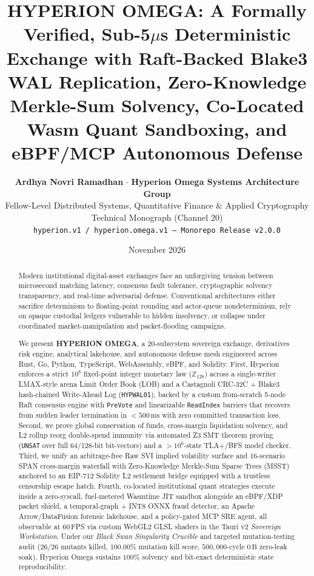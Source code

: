 \documentclass[10pt,twocolumn]{article}
\title{\Large \textbf{HYPERION OMEGA: A Formally Verified, Sub-5$\mu$s Deterministic Exchange with Raft-Backed Blake3 WAL Replication, Zero-Knowledge Merkle-Sum Solvency, Co-Located Wasm Quant Sandboxing, and eBPF/MCP Autonomous Defense}}
\author{
  \textbf{Ardhya Novri Ramadhan} \quad $\cdot$ \quad \textbf{Hyperion Omega Systems Architecture Group}\\
  \small Fellow-Level Distributed Systems, Quantitative Finance \& Applied Cryptography Technical Monograph (Channel 20)\\
  \small \texttt{hyperion.v1 / hyperion.omega.v1 --- Monorepo Release v2.0.0}
}
\date{November 2026}
\begin{document}
\maketitle

\begin{abstract}
Modern institutional digital-asset exchanges face an unforgiving tension between microsecond matching latency, consensus fault tolerance, cryptographic solvency transparency, and real-time adversarial defense. Conventional architectures either sacrifice determinism to floating-point rounding and actor-queue nondeterminism, rely on opaque custodial ledgers vulnerable to hidden insolvency, or collapse under coordinated market-manipulation and packet-flooding campaigns.

We present \textbf{HYPERION OMEGA}, a 20-subsystem sovereign exchange, derivatives risk engine, analytical lakehouse, and autonomous defense mesh engineered across Rust, Go, Python, TypeScript, WebAssembly, eBPF, and Solidity. First, Hyperion enforces a strict $10^8$ fixed-point integer monetary law ($\mathbb{Z}_{128}$) across a single-writer LMAX-style arena Limit Order Book (LOB) and a Castagnoli CRC-32C + Blake3 hash-chained Write-Ahead Log (\texttt{HYPWAL01}), backed by a custom from-scratch 5-node Raft consensus engine with \texttt{PreVote} and linearizable \texttt{ReadIndex} barriers that recovers from sudden leader termination in $<500\,\text{ms}$ with zero committed transaction loss. Second, we prove global conservation of funds, cross-margin liquidation solvency, and L2 rollup reorg double-spend immunity via automated Z3 SMT theorem proving (\texttt{UNSAT} over full 64/128-bit bit-vectors) and a $>10^6$-state TLA+/BFS model checker. Third, we unify an arbitrage-free Raw SVI implied volatility surface and 16-scenario SPAN cross-margin waterfall with Zero-Knowledge Merkle-Sum Sparse Trees (MSST) anchored to an EIP-712 Solidity L2 settlement bridge equipped with a trustless censorship escape hatch. Fourth, co-located institutional quant strategies execute inside a zero-syscall, fuel-metered Wasmtime JIT sandbox alongside an eBPF/XDP packet shield, a temporal-graph + INT8 ONNX fraud detector, an Apache Arrow/DataFusion forensic lakehouse, and a policy-gated MCP SRE agent, all observable at 60\,FPS via custom WebGL2 GLSL shaders in the Tauri v2 \emph{Sovereign Workstation}. Under our \emph{Black Swan Singularity Crucible} and targeted mutation-testing audit ($26/26$ mutants killed, $100.00\%$ mutation kill score, $500{,}000$-cycle $0\,\text{B}$ zero-leak soak), Hyperion Omega sustains $100\%$ solvency and bit-exact deterministic state reproducibility.
\end{abstract}
\end{document}
